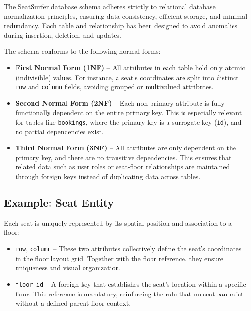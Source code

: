 \documentclass[12pt,a4paper]{report}
\begin{document}
The SeatSurfer database schema adheres strictly to relational database normalization principles, ensuring data consistency, efficient storage, and minimal redundancy. Each table and relationship has been designed to avoid anomalies during insertion, deletion, and updates.

The schema conforms to the following normal forms:

\begin{itemize}
    \item \textbf{First Normal Form (1NF)} – All attributes in each table hold only atomic (indivisible) values. For instance, a seat's coordinates are split into distinct \texttt{row} and \texttt{column} fields, avoiding grouped or multivalued attributes.
    
    \item \textbf{Second Normal Form (2NF)} – Each non-primary attribute is fully functionally dependent on the entire primary key. This is especially relevant for tables like \texttt{bookings}, where the primary key is a surrogate key (\texttt{id}), and no partial dependencies exist.

    \item \textbf{Third Normal Form (3NF)} – All attributes are only dependent on the primary key, and there are no transitive dependencies. This ensures that related data such as user roles or seat-floor relationships are maintained through foreign keys instead of duplicating data across tables.
\end{itemize}

\subsection*{Example: Seat Entity}

Each seat is uniquely represented by its spatial position and association to a floor:

\begin{itemize}
    \item \texttt{row}, \texttt{column} – These two attributes collectively define the seat’s coordinates in the floor layout grid. Together with the floor reference, they ensure uniqueness and visual organization.
    
    \item \texttt{floor\_id} – A foreign key that establishes the seat’s location within a specific floor. This reference is mandatory, reinforcing the rule that no seat can exist without a defined parent floor context.
\end{itemize}
\end{document}
